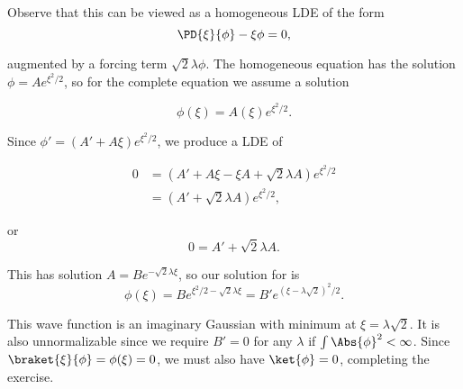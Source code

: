 {Observe that this can be viewed as a homogeneous LDE of the form
\begin{equation}\label{eqn:qmIexamPractice2008Dec:1e:40}
\PD{\xi}{\phi} - \xi \phi = 0,
\end{equation}

augmented by a forcing term \(\sqrt{2}\lambda \phi\).  The homogeneous equation has the solution \(\phi = A e^{\xi^2/2}\), so for the complete equation we assume a solution

\begin{equation}\label{eqn:qmIexamPractice2008Dec:1e:50}
\phi(\xi) = A(\xi) e^{\xi^2/2}.
\end{equation}

Since \(\phi' = (A' + A \xi) e^{\xi^2/2}\), we produce a LDE of

\begin{equation}\label{eqn:qmIexamPractice:670}
\begin{aligned}
0 &= (A' + A \xi -\xi A + \sqrt{2} \lambda A ) e^{\xi^2/2} \\
&= (A' + \sqrt{2} \lambda A ) e^{\xi^2/2},
\end{aligned}
\end{equation}

or
\begin{equation}\label{eqn:qmIexamPractice2008Dec:1e:60}
0 = A' + \sqrt{2} \lambda A.
\end{equation}

This has solution \(A = B e^{-\sqrt{2} \lambda \xi}\), so our solution for  is
\begin{equation}\label{eqn:qmIexamPractice2008Dec:1e:70}
\phi(\xi) = B e^{\xi^2/2 - \sqrt{2} \lambda \xi}
= B' e^{ (\xi - \lambda \sqrt{2} )^2/2}.
\end{equation}

This wave function is an imaginary Gaussian with minimum at \(\xi = \lambda\sqrt{2}\).  It is also unnormalizable since we require \(B' = 0\) for any \(\lambda\) if \(\int \Abs{\phi}^2 < \infty\).  Since \(\braket{\xi}{\phi} = \phi(\xi) = 0\), we must also have \(\ket{\phi} = 0\), completing the exercise.

} %
